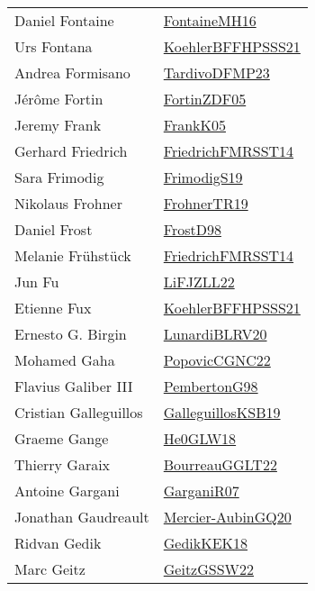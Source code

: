 {\begin{longtable}{p{4cm}p{20cm}}
Daniel Fontaine & \href{papers/FontaineMH16.pdf}{FontaineMH16}\cite{FontaineMH16} \\
Urs Fontana & \href{articles/KoehlerBFFHPSSS21.pdf}{KoehlerBFFHPSSS21}\cite{KoehlerBFFHPSSS21} \\
Andrea Formisano & \href{papers/TardivoDFMP23.pdf}{TardivoDFMP23}\cite{TardivoDFMP23} \\
J{\'{e}}r{\^{o}}me Fortin & \href{papers/FortinZDF05.pdf}{FortinZDF05}\cite{FortinZDF05} \\
Jeremy Frank & \href{papers/FrankK05.pdf}{FrankK05}\cite{FrankK05} \\
Gerhard Friedrich & \href{}{FriedrichFMRSST14}\cite{FriedrichFMRSST14} \\
Sara Frimodig & \href{papers/FrimodigS19.pdf}{FrimodigS19}\cite{FrimodigS19} \\
Nikolaus Frohner & \href{papers/FrohnerTR19.pdf}{FrohnerTR19}\cite{FrohnerTR19} \\
Daniel Frost & \href{papers/FrostD98.pdf}{FrostD98}\cite{FrostD98} \\
Melanie Fr{\"{u}}hst{\"{u}}ck & \href{}{FriedrichFMRSST14}\cite{FriedrichFMRSST14} \\
Jun Fu & \href{papers/LiFJZLL22.pdf}{LiFJZLL22}\cite{LiFJZLL22} \\
Etienne Fux & \href{articles/KoehlerBFFHPSSS21.pdf}{KoehlerBFFHPSSS21}\cite{KoehlerBFFHPSSS21} \\
Ernesto G. Birgin & \href{articles/LunardiBLRV20.pdf}{LunardiBLRV20}\cite{LunardiBLRV20} \\
Mohamed Gaha & \href{papers/PopovicCGNC22.pdf}{PopovicCGNC22}\cite{PopovicCGNC22} \\
Flavius Galiber III & \href{}{PembertonG98}\cite{PembertonG98} \\
Cristian Galleguillos & \href{papers/GalleguillosKSB19.pdf}{GalleguillosKSB19}\cite{GalleguillosKSB19} \\
Graeme Gange & \href{papers/He0GLW18.pdf}{He0GLW18}\cite{He0GLW18} \\
Thierry Garaix & \href{}{BourreauGGLT22}\cite{BourreauGGLT22} \\
Antoine Gargani & \href{papers/GarganiR07.pdf}{GarganiR07}\cite{GarganiR07} \\
Jonathan Gaudreault & \href{papers/Mercier-AubinGQ20.pdf}{Mercier-AubinGQ20}\cite{Mercier-AubinGQ20} \\
Ridvan Gedik & \href{articles/GedikKEK18.pdf}{GedikKEK18}\cite{GedikKEK18} \\
Marc Geitz & \href{papers/GeitzGSSW22.pdf}{GeitzGSSW22}\cite{GeitzGSSW22} \\

\end{longtable}}
